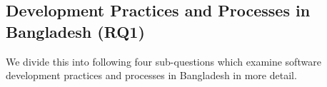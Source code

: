 \subsection{Development Practices and Processes in Bangladesh (RQ1)}
\label{RQ1}

We divide this into following four sub-questions which examine software development practices and processes in Bangladesh in more detail.





